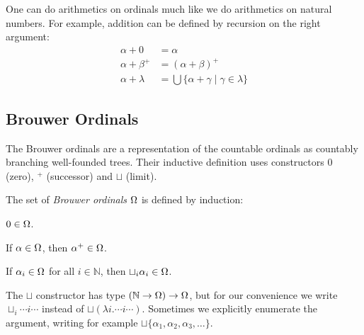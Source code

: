 One can do arithmetics on ordinals much like we do arithmetics on natural
numbers. For example, addition can be defined by recursion on the right
argument:
\begin{align*}
  \alpha + 0       &= \alpha\\
  \alpha + \beta^+ &= (\alpha + \beta)^+\\
  \alpha + \lambda &= \bigcup \{ \alpha + \gamma \; | \; \gamma \in \lambda \}
\end{align*}


\subsection{Brouwer Ordinals}\label{sub:brouwer}



%

The Brouwer ordinals are a representation of the countable ordinals as
countably branching well-founded trees. Their inductive definition
uses constructors $0$ (zero), $^+$ (successor) and $\sqcup$ (limit).

\begin{definition}\label{def:ordinals}%
The set of \emph{Brouwer ordinals} $\Omega$ is defined by induction:
\begin{compactenum}
  \item
    $0 \in \Omega$.
  \item
    If $\alpha \in \Omega$, then $\alpha^+ \in \Omega$.
  \item
    If $\alpha_i \in \Omega$ for all $i \in \mathbb{N}$, then $\sqcup_i
    \alpha_i \in \Omega$.
\end{compactenum}
\end{definition}
The $\sqcup$ constructor has type $(\mathbb{N} \rightarrow \Omega) \rightarrow
\Omega$, but for our convenience we write $\sqcup_i \cdots i \cdots$ instead
of $\sqcup (\lambda i . \cdots i \cdots)$. Sometimes we explicitly enumerate
the argument, writing for example $\sqcup \{ \alpha_1, \alpha_2,
\alpha_3, \ldots \}$.

